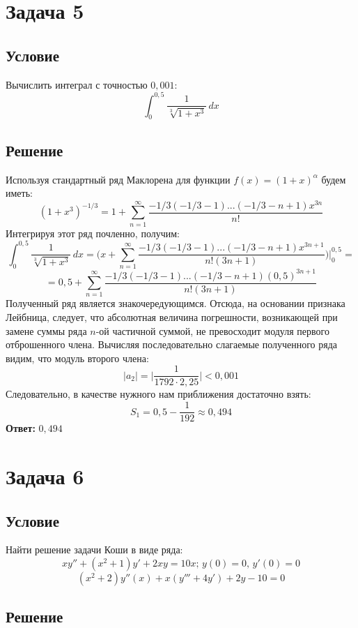 \documentclass[12pt]{article}
\begin{document}
	\section*{Задача 5}	
	\subsection*{Условие}

	Вычислить интеграл с точностью $ 0,001 $:
	$$ \int_0^{0,5} \frac{1}{\sqrt[3]{1+x^3}} \, dx$$

	\subsection*{Решение}
	
	Используя стандартный ряд Маклорена для функции $ f(x) = (1+x)^\alpha $ будем иметь:
	$$ (1+x^3)^{-1/3} = 1 + \sum_{n=1}^\infty \frac{-1/3(-1/3 - 1)...(-1/3 - n + 1)x^{3n}}{n!} $$
	Интегрируя этот ряд почленно, получим:
	$$ \int_0^{0,5} \frac{1}{\sqrt[3]{1+x^3}} \, dx = \Big(x + \sum_{n=1}^\infty \frac{-1/3(-1/3 - 1)...(-1/3 - n + 1)x^{3n+1}}{n!(3n+1)} \Big) \Big|_0^{0,5} = $$
	$$ = 0,5 + \sum_{n=1}^\infty \frac{-1/3(-1/3 - 1)...(-1/3 - n + 1)(0,5)^{3n+1}}{n!(3n+1)} $$
	Полученный ряд является знакочередующимся. Отсюда, на основании признака Лейбница, следует, что абсолютная величина погрешности, возникающей при замене суммы ряда $ n $-ой частичной суммой, не превосходит модуля первого отброшенного члена. Вычисляя последовательно слагаемые полученного ряда видим, что модуль второго члена:
	$$ |a_2| = \Big| \frac{1}{1792\cdot2,25} \Big| < 0,001 $$
	Следовательно, в качестве нужного нам приближения достаточно взять:
	$$ S_1 = 0,5 - \frac{1}{192} \approx 0,494 $$
	\hspace{350pt}\textbf{Ответ:} $ 0,494  $
	\newpage
	\section*{Задача 6}	
	\subsection*{Условие}

	Найти решение задачи Коши в виде ряда:
	$$ xy'' + (x^2 + 1)y' + 2xy = 10x; \, y(0) = 0, \, y'(0) = 0 $$
	$$ (x^2 + 2) y''(x) + x (y''' + 4 y') + 2 y - 10 = 0 $$
	\subsection*{Решение}
\end{document}
